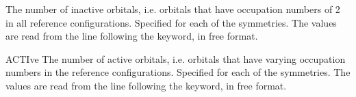 \begin{keywordlist}
The number of inactive orbitals, i.e. orbitals that have
occupation numbers of 2 in all reference configurations. Specified for
each of the symmetries. The values are read from the line
following the keyword, in free format.
\item[ACTIve]
The number of active orbitals, i.e. orbitals that have varying
occupation numbers in the reference configurations. Specified for each
of the symmetries. The values are read from the line following
the keyword, in free format.


\end{keywordlist}
